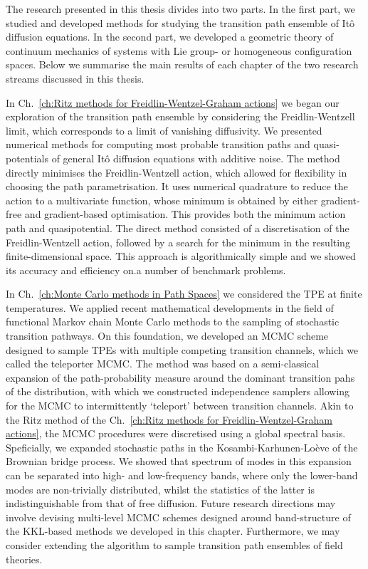 \documentclass[]{cam-thesis}
\begin{document}
The research presented in this thesis divides into two parts. In the first part, we studied and developed methods for studying the transition path ensemble of It\^{o} diffusion equations. In the second part, we developed a geometric theory of continuum mechanics of systems with Lie group- or homogeneous configuration spaces. Below we summarise the main results of each chapter of the two research streams discussed in this thesis.


In Ch.~\ref{ch:Ritz methods for Freidlin-Wentzel-Graham actions} we began our exploration of the transition path ensemble by considering the Freidlin-Wentzell limit, which corresponds to a limit of vanishing diffusivity. We presented numerical methods for computing most probable transition paths and quasi-potentials of general It\^{o} diffusion equations with additive noise. The method directly minimises the Freidlin-Wentzell action, which allowed for flexibility in choosing the path parametrisation. It uses numerical quadrature to reduce the action to a multivariate function, whose minimum is obtained by either gradient-free and gradient-based optimisation. This provides both the minimum action path and quasipotential. The direct method consisted of a discretisation of the Freidlin-Wentzell action, followed by a search for the minimum in the resulting finite-dimensional space. This approach is algorithmically simple and we showed its accuracy and efficiency on.a number of benchmark problems.

In Ch.~\ref{ch:Monte Carlo methods in Path Spaces} we considered the TPE at finite temperatures. We applied recent mathematical developments in the field of functional Markov chain Monte Carlo methods to the sampling of stochastic transition pathways. On this foundation, we developed an MCMC scheme designed to sample TPEs with multiple competing transition channels, which we called the teleporter MCMC. The method was based on a semi-classical expansion of the path-probability measure around the dominant transition pahs of the distribution, with which we constructed independence samplers allowing for the MCMC to intermittently `teleport' between transition channels. Akin to the Ritz method of the Ch.~\ref{ch:Ritz methods for Freidlin-Wentzel-Graham actions}, the MCMC procedures were discretised using a global spectral basis. Speficially, we expanded stochastic paths in the Kosambi-Karhunen-Lo\`eve of the Brownian bridge process. We showed that spectrum of modes in this expansion can be separated into high- and low-frequency bands, where only the lower-band modes are non-trivially distributed, whilst the statistics of the latter is indistinguishable from that of free diffusion. Future research directions may involve devising multi-level MCMC schemes designed around band-structure of the KKL-based methods we developed in this chapter. Furthermore, we may consider extending the algorithm to sample transition path ensembles of field theories. 
\end{document}
